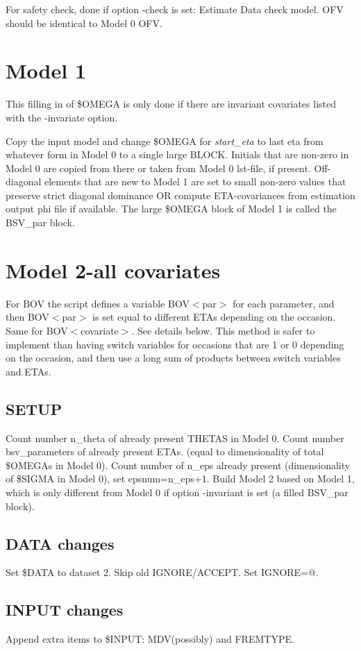 For safety check, done if option -check is set: Estimate Data check model. OFV should be identical to Model 0 OFV.

\section{Model 1}
This filling in of \$OMEGA is only done if there are invariant covariates listed with the -invariate option.

Copy the input model and change \$OMEGA for \emph{start\_eta} to last eta from whatever form in Model 0 to a single large BLOCK. 
Initials that are non-zero in Model 0 are copied from there or taken from Model 0 lst-file, if present. 
Off-diagonal elements that are new to Model 1 are set to small non-zero values that preserve strict 
diagonal dominance OR compute ETA-covariances from estimation output phi file if available. 
The large \$OMEGA block of Model 1 is called the BSV\_par block.

\section{Model 2-all covariates}

For BOV the script defines a variable BOV$<$par$>$ for each parameter, and then BOV$<$par$>$ is set equal to different ETAs depending on the occasion. Same for BOV$<$covariate$>$. See details below. This method is safer to implement than having switch variables for occasions that are 1 or 0 depending on the occasion, and then use a long sum of products between switch variables and ETAs. 

\subsection{SETUP}
Count number n\_theta of already present THETAS in Model 0. Count number bsv\_parameters of already present ETAs. (equal to dimensionality of total \$OMEGAs in Model 0). Count number of n\_eps already present (dimensionality of \$SIGMA in Model 0), set epsnum=n\_eps+1.
Build Model 2 based on Model 1, which is only different from Model 0 if option -invariant is set (a filled BSV\_par block).

\subsection{DATA changes}
Set \$DATA to dataset 2. Skip old IGNORE/ACCEPT. Set IGNORE=@.

\subsection{INPUT changes}
Append extra items to \$INPUT: MDV(possibly) and FREMTYPE.

